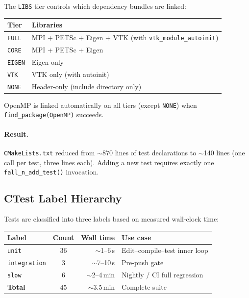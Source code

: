 The \texttt{LIBS} tier controls which dependency bundles are linked:

\begin{center}
\small
\begin{tabular}{lp{8cm}}
\toprule
\textbf{Tier} & \textbf{Libraries} \\
\midrule
\texttt{FULL} & MPI + PETSc + Eigen + VTK (with \texttt{vtk\_module\_autoinit}) \\
\texttt{CORE} & MPI + PETSc + Eigen \\
\texttt{EIGEN}& Eigen only \\
\texttt{VTK}  & VTK only (with autoinit) \\
\texttt{NONE} & Header-only (include directory only) \\
\bottomrule
\end{tabular}
\end{center}

OpenMP is linked automatically on all tiers (except \texttt{NONE})
when \texttt{find\_package(OpenMP)} succeeds.

\paragraph{Result.}  \texttt{CMakeLists.txt} reduced from $\sim$870
lines of test declarations to $\sim$140 lines (one call per test,
three lines each).  Adding a new test requires exactly one
\texttt{fall\_n\_add\_test()} invocation.

\subsection{CTest Label Hierarchy}
\label{sec:ctest-labels}

Tests are classified into three labels based on measured wall-clock
time:

\begin{center}
\small
\begin{tabular}{lcrl}
\toprule
\textbf{Label} & \textbf{Count} & \textbf{Wall time} & \textbf{Use case} \\
\midrule
\texttt{unit}        & 36 & $\sim$1--6\,s   & Edit--compile--test inner loop \\
\texttt{integration} &  3 & $\sim$7--10\,s  & Pre-push gate \\
\texttt{slow}        &  6 & $\sim$2--4\,min & Nightly / CI full regression \\
\midrule
\textbf{Total}       & 45 & $\sim$3.5\,min  & Complete suite \\
\bottomrule
\end{tabular}
\end{center}

